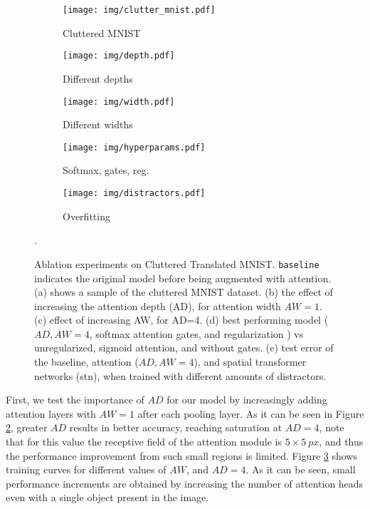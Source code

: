 \documentclass[runningheads]{llncs}
\begin{document}
\begin{figure}[!t]
\centering
\begin{subfigure}[!t]{0.26\textwidth}
\centering
\texttt{[image: img/clutter\_mnist.pdf]}
\caption{Cluttered MNIST}
\label{fig:clutter_mnist}
\end{subfigure}
\begin{subfigure}[!t]{0.32\textwidth}
\centering
\texttt{[image: img/depth.pdf]}
\caption{Different depths}
\label{fig:ablation_depth}
\end{subfigure}
\begin{subfigure}[!t]{0.32\textwidth}
\centering
\texttt{[image: img/width.pdf]}
\caption{Different widths}
\label{fig:ablation_width}
\end{subfigure}
\begin{subfigure}[!t]{0.32\textwidth}
\centering
\texttt{[image: img/hyperparams.pdf]}
\caption{Softmax, gates, reg.}
\label{fig:hyperparams}
\end{subfigure}
\begin{subfigure}[!t]{0.32\textwidth}
\centering
\texttt{[image: img/distractors.pdf]}
\caption{Overfitting}
\label{fig:distractors}
\end{subfigure}
\caption{Ablation experiments on Cluttered Translated MNIST. \texttt{baseline} indicates the original model before being augmented with attention. (a) shows a sample of the cluttered MNIST dataset. (b) the effect of increasing the attention depth (AD), for attention width $AW=1$. (c) effect of increasing AW, for AD=4. (d) best performing model ($AD,AW=4$, softmax attention gates, and regularization \cite{zhao2017diversified}) vs unregularized, sigmoid attention, and without gates. (e) test error of the baseline, attention ($AD,AW=4$), and spatial transformer networks (stn), when trained with different amounts of distractors. }.
\label{fig:ablation}
\end{figure}

First, we test the importance of $AD$ for our model by increasingly adding attention layers with $AW=1$ after each pooling layer. As it can be seen in Figure \ref{fig:ablation_depth}, greater $AD$ results in better accuracy, reaching saturation at $AD = 4$, note that for this value the receptive field of the attention module is $5\times5\ px$, and thus the performance improvement from such small regions is limited. Figure \ref{fig:ablation_width} shows training curves for different values of $AW$, and $AD=4$. As it can be seen, small performance increments are obtained by increasing the number of attention heads even with a single object present in the image. 
\end{document}
